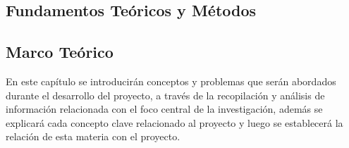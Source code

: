 \begin{justify}
\chapter[Fundamentos Teóricos y Métodos]{Fundamentos Teóricos y Métodos}
\label{ch:marcoteorico}
\section{Marco Teórico}
En este capítulo se introducirán conceptos y problemas que serán abordados durante el desarrollo del proyecto, a través de la recopilación y análisis de información relacionada con el foco central de la investigación, además se explicará cada concepto clave relacionado al proyecto y luego se establecerá la relación de esta materia con el proyecto.


\end{justify}
